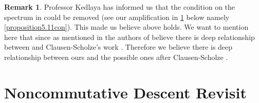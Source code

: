 \documentclass[12pt]{amsart}
\theoremstyle{definition}
\newtheorem{remark}[theorem]{Remark}
\numberwithin{equation}{section}
\begin{document}
%


\begin{remark}
Professor Kedlaya has informed us that the condition on the spectrum in \cite[Theorem 1.3.9 (b)]{KL1} could be removed (see our amplification in \cref{section5} below namely \cref{proposition5.11con}). This made us believe above holds. We want to mention here that since as mentioned in \cite{BK} the authors of \cite{BK} believe there is deep relationship between \cite{BK} and Clausen-Scholze's work \cite{CS}. Therefore we believe there is deep relationship between ours and the possible ones after Clausen-Scholze \cite{CS}. 
\end{remark}
























\newpage

\section{Noncommutative Descent Revisit} \label{section5}
\end{document}
